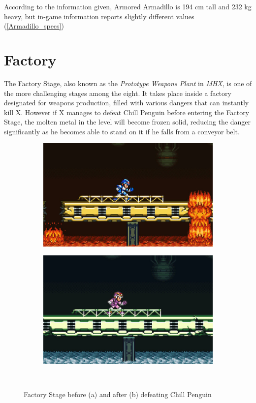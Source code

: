 According to the information given, Armored Armadillo is 194 cm tall and 232 kg heavy, but in-game information reports slightly different values (\ref{Armadillo_specs})


\section{Factory} 
The Factory Stage, also known as the \textit{Prototype Weapons Plant} in \textit{MHX}, is one of the more challenging stages among the eight. It takes place inside a factory designated for weapons production, filled with various dangers that can instantly kill X. However if X manages to defeat Chill Penguin before entering the Factory Stage, the molten metal in the level will become frozen solid, reducing the danger significantly as he becomes able to stand on it if he falls from a conveyor belt.
\begin{figure}[htp]
	\centering
	\begin{subfigure}{0.49\textwidth}
		\centering
		\includegraphics[width=\linewidth]{figures/X1/Flame_mammoth/Flame_fire.jpg}
		\caption{}
	\end{subfigure}
	\begin{subfigure}{0.465\textwidth}
		\centering
		\includegraphics[width=\linewidth]{figures/X1/Flame_mammoth/Flame_frozen.jpg}
		\caption{}
	\end{subfigure}\\
	\caption{Factory Stage before (a) and after (b)  defeating Chill Penguin}
\end{figure}
